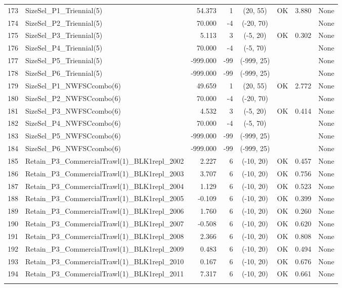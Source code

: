 \documentclass[12pt,]{article}
\begin{document}
\begin{landscape}
\begin{longtable}{rlrrcccl}
  173 & SizeSel\_P1\_Triennial(5) & 54.373 & 1 & (20, 55) & OK & 3.880 & None \\ 
  174 & SizeSel\_P2\_Triennial(5) & 70.000 & -4 & (-20, 70) &  &  & None \\ 
  175 & SizeSel\_P3\_Triennial(5) & 5.113 & 3 & (-5, 20) & OK & 0.302 & None \\ 
  176 & SizeSel\_P4\_Triennial(5) & 70.000 & -4 & (-5, 70) &  &  & None \\ 
  177 & SizeSel\_P5\_Triennial(5) & -999.000 & -99 & (-999, 25) &  &  & None \\ 
  178 & SizeSel\_P6\_Triennial(5) & -999.000 & -99 & (-999, 25) &  &  & None \\ 
  179 & SizeSel\_P1\_NWFSCcombo(6) & 49.659 & 1 & (20, 55) & OK & 2.772 & None \\ 
  180 & SizeSel\_P2\_NWFSCcombo(6) & 70.000 & -4 & (-20, 70) &  &  & None \\ 
  181 & SizeSel\_P3\_NWFSCcombo(6) & 4.532 & 3 & (-5, 20) & OK & 0.414 & None \\ 
  182 & SizeSel\_P4\_NWFSCcombo(6) & 70.000 & -4 & (-5, 70) &  &  & None \\ 
  183 & SizeSel\_P5\_NWFSCcombo(6) & -999.000 & -99 & (-999, 25) &  &  & None \\ 
  184 & SizeSel\_P6\_NWFSCcombo(6) & -999.000 & -99 & (-999, 25) &  &  & None \\ 
  185 & Retain\_P3\_CommercialTrawl(1)\_BLK1repl\_2002 & 2.227 & 6 & (-10, 20) & OK & 0.457 & None \\ 
  186 & Retain\_P3\_CommercialTrawl(1)\_BLK1repl\_2003 & 3.707 & 6 & (-10, 20) & OK & 0.756 & None \\ 
  187 & Retain\_P3\_CommercialTrawl(1)\_BLK1repl\_2004 & 1.129 & 6 & (-10, 20) & OK & 0.523 & None \\ 
  188 & Retain\_P3\_CommercialTrawl(1)\_BLK1repl\_2005 & -0.109 & 6 & (-10, 20) & OK & 0.399 & None \\ 
  189 & Retain\_P3\_CommercialTrawl(1)\_BLK1repl\_2006 & 1.760 & 6 & (-10, 20) & OK & 0.260 & None \\ 
  190 & Retain\_P3\_CommercialTrawl(1)\_BLK1repl\_2007 & -0.508 & 6 & (-10, 20) & OK & 0.620 & None \\ 
  191 & Retain\_P3\_CommercialTrawl(1)\_BLK1repl\_2008 & 2.366 & 6 & (-10, 20) & OK & 0.808 & None \\ 
  192 & Retain\_P3\_CommercialTrawl(1)\_BLK1repl\_2009 & 0.483 & 6 & (-10, 20) & OK & 0.494 & None \\ 
  193 & Retain\_P3\_CommercialTrawl(1)\_BLK1repl\_2010 & 0.167 & 6 & (-10, 20) & OK & 0.676 & None \\ 
  194 & Retain\_P3\_CommercialTrawl(1)\_BLK1repl\_2011 & 7.317 & 6 & (-10, 20) & OK & 0.661 & None \\ 
   \hline
\hline
\label{tab:Model1_params}
\end{longtable}
\end{landscape}
\end{document}

